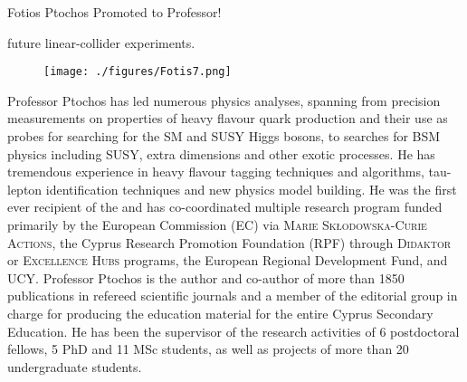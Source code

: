 \begin{headline}[enhanced, tikz={rotate=0}, width=1.0\textwidth]{Fotios Ptochos Promoted to Professor!}
\begin{multicols}{2}
    future linear-collider experiments. 
    \begin{figure}
      \begin{center}
      \leavevmode
      \texttt{[image: ./figures/Fotis7.png]}
      \end{center}
    \end{figure}
    Professor Ptochos has led numerous physics analyses, spanning
    from precision measurements on properties of heavy flavour quark
    production and their use as probes for searching for the SM and SUSY
    Higgs bosons, to searches for BSM physics including SUSY, extra
    dimensions and other exotic processes. He has tremendous experience in
    heavy flavour tagging techniques and algorithms, tau-lepton
    identification techniques and new physics model building. 
    He was the first ever recipient of the  and has co-coordinated multiple research program
    funded primarily by the European Commission (EC) via \textsc{Marie
    Skłodowska-Curie Actions},  the Cyprus Research Promotion
    Foundation (RPF) through \textsc{Didaktor} or \textsc{Excellence
      Hubs} programs, the European Regional Development Fund, and
    UCY. Professor Ptochos is the author and co-author of more than 
    1850 publications in refereed scientific journals and a member of the
    editorial group in charge for producing the education material
    for the entire Cyprus Secondary Education. He has been the
    supervisor of the research activities of 6 postdoctoral fellows, 5
    PhD and 11 MSc students, as well as projects of more than 20
    undergraduate students.  
\end{multicols}
\end{headline}

